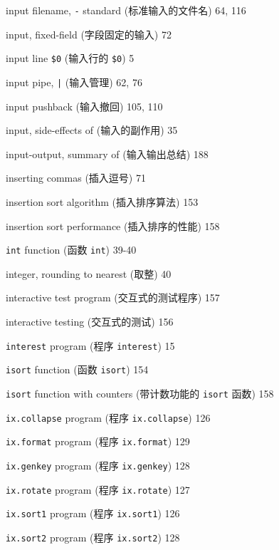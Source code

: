 \begin{multicols}{3}
\hangindent=3pc  input filename, \verb'-' standard
(标准输入的文件名) 64, 116

\hangindent=3pc  input, fixed-field (字段固定的输入) 72

\hangindent=3pc  input line \verb'$0' (输入行的 \verb'$0') 5

\hangindent=3pc  input pipe, \verb'|' (输入管理) 62, 76

\hangindent=3pc  input pushback (输入撤回) 105, 110

\hangindent=3pc  input, side-effects of (输入的副作用) 35

\hangindent=3pc  input-output, summary of (输入输出总结) 188

\hangindent=3pc  inserting commas (插入逗号) 71

\hangindent=3pc  insertion sort algorithm (插入排序算法) 153

\hangindent=3pc  insertion sort performance (插入排序的性能) 158

\hangindent=3pc  \verb'int' function (函数 \verb'int') 39-40

\hangindent=3pc  integer, rounding to nearest (取整) 40

\hangindent=3pc  interactive test program (交互式的测试程序) 157

\hangindent=3pc  interactive testing (交互式的测试) 156

\hangindent=3pc  \verb'interest' program (程序 \verb'interest') 15 

\hangindent=3pc  \verb'isort' function (函数 \verb'isort') 154

\hangindent=3pc  \verb'isort' function with counters
(带计数功能的 \verb'isort' 函数) 158

\hangindent=3pc  \verb'ix.collapse' program (程序
\verb'ix.collapse') 126

\hangindent=3pc  \verb'ix.format' program (程序
\verb'ix.format') 129 

\hangindent=3pc  \verb'ix.genkey' program (程序
\verb'ix.genkey') 128 

\hangindent=3pc  \verb'ix.rotate' program (程序
\verb'ix.rotate') 127 

\hangindent=3pc  \verb'ix.sort1' program (程序 \verb'ix.sort1') 126

\hangindent=3pc  \verb'ix.sort2' program (程序 \verb'ix.sort2') 128 


\end{multicols}
